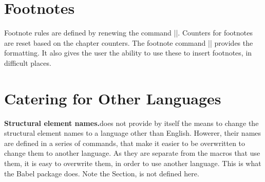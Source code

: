 \section{Footnotes}

\begin{macro}{\footnoterule}
\begin{macro}{\@makefntext}
\begin{macro}{\@makefnmark}
 Footnote rules are defined by renewing the command |\footnoterule|. Counters for footnotes are reset based on the chapter counters. The footnote command |\@makefntext| provides the formatting. It also gives the user the ability to use these to insert footnotes, in difficult places.
\end{macro}
\end{macro}
\end{macro}

\begin{teX}
\renewcommand\footnoterule{%
  \kern-3\p@
  \hrule\@width.4\columnwidth
  \kern2.6\p@}


\newcommand\@makefntext[1]{%
    \parindent 1em%
    \noindent
    \hb@xt@1.8em{\hss\@makefnmark}#1}
\end{teX}

\section*{Catering for Other Languages}

\begin{multicols}{2}
\textbf{Structural element names.}\quad \latex does not provide by itself the means to change the structural element names to a language other than English. Howerer, their names are defined  in a series of commands, that make it easier to be overwritten to change them to another language. As they are separate from the macros that use them, it is easy to overwrite them, in order to use another language. This is what the Babel package does. Note the Section, is not defined here.
\end{multicols}

\begin{teX}
\newcommand\contentsname{Contents}
\newcommand\listfigurename{List of Figures}
\newcommand\listtablename{List of Tables}
\newcommand\bibname{Bibliography}
\newcommand\indexname{Index}
\newcommand\figurename{Figure}
\newcommand\tablename{Table}
\newcommand\partname{Part}
\newcommand\chaptername{Chapter}
\newcommand\appendixname{Appendix}
\end{teX}

